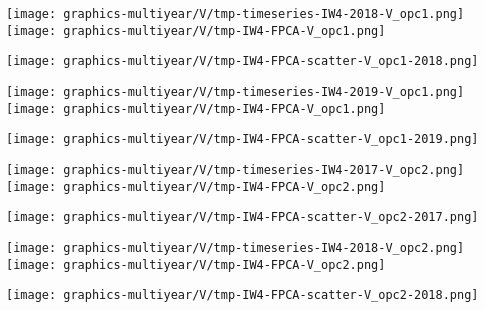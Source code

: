 
\begin{center}
\begin{minipage}{7.0in}
\texttt{[image: graphics-multiyear/V/tmp-timeseries-IW4-2018-V\_opc1.png]}
\quad
\texttt{[image: graphics-multiyear/V/tmp-IW4-FPCA-V\_opc1.png]}
\vskip 1.0cm
\begin{center}
\texttt{[image: graphics-multiyear/V/tmp-IW4-FPCA-scatter-V\_opc1-2018.png]}
\end{center}
\end{minipage}
\end{center}


\begin{center}
\begin{minipage}{7.0in}
\texttt{[image: graphics-multiyear/V/tmp-timeseries-IW4-2019-V\_opc1.png]}
\quad
\texttt{[image: graphics-multiyear/V/tmp-IW4-FPCA-V\_opc1.png]}
\vskip 1.0cm
\begin{center}
\texttt{[image: graphics-multiyear/V/tmp-IW4-FPCA-scatter-V\_opc1-2019.png]}
\end{center}
\end{minipage}
\end{center}


\begin{center}
\begin{minipage}{7.0in}
\texttt{[image: graphics-multiyear/V/tmp-timeseries-IW4-2017-V\_opc2.png]}
\quad
\texttt{[image: graphics-multiyear/V/tmp-IW4-FPCA-V\_opc2.png]}
\vskip 1.0cm
\begin{center}
\texttt{[image: graphics-multiyear/V/tmp-IW4-FPCA-scatter-V\_opc2-2017.png]}
\end{center}
\end{minipage}
\end{center}


\begin{center}
\begin{minipage}{7.0in}
\texttt{[image: graphics-multiyear/V/tmp-timeseries-IW4-2018-V\_opc2.png]}
\quad
\texttt{[image: graphics-multiyear/V/tmp-IW4-FPCA-V\_opc2.png]}
\vskip 1.0cm
\begin{center}
\texttt{[image: graphics-multiyear/V/tmp-IW4-FPCA-scatter-V\_opc2-2018.png]}
\end{center}
\end{minipage}
\end{center}

